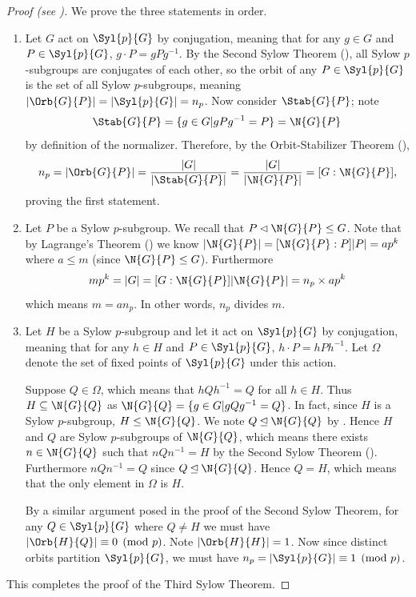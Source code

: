 \begin{proof}[Proof (see \cite{wielandt_1959})]
    We prove the three statements in order.
    \begin{enumerate}
        \item Let $G$ act on $\Syl{p}{G}$ by conjugation, meaning that for any $g \in G$ and $P \in \Syl{p}{G}$, $g\cdot P = gPg^{-1}$. By the Second Sylow Theorem (), all Sylow $p$-subgroups are conjugates of each other, so the orbit of any $P \in \Syl{p}{G}$ is the set of all Sylow $p$-subgroups, meaning $|\Orb{G}{P}| = |\Syl{p}{G}| = n_p$. Now consider $\Stab{G}{P}$; note
        \[
            \Stab{G}{P} = \{g \in G \vert gPg^{-1} = P\} = \N{G}{P}
        \]
        by definition of the normalizer. Therefore, by the Orbit-Stabilizer Theorem (),
        \[
            n_p = |\Orb{G}{P}| = \frac{|G|}{|\Stab{G}{P}|} = \frac{|G|}{|\N{G}{P}|} = [G : \N{G}{P}],
        \]
        proving the first statement.

        \item Let $P$ be a Sylow $p$-subgroup. We recall that $P \lhd \N{G}{P} \leq G$. Note that by Lagrange's Theorem () we know $|\N{G}{P}| = [\N{G}{P} : P]|P| = ap^k$ where $a \leq m$ (since $\N{G}{P} \leq G$). Furthermore
        \[
            mp^k = |G| = [G: \N{G}{P}]|\N{G}{P}| = n_p \times ap^k
        \]
        which means $m = an_p$. In other words, $n_p$ divides $m$.

        \item Let $H$ be a Sylow $p$-subgroup and let it act on $\Syl{p}{G}$ by conjugation, meaning that for any $h \in H$ and $P \in \Syl{p}{G}$, $h \cdot P = hPh^{-1}$. Let $\Omega$ denote the set of fixed points of $\Syl{p}{G}$ under this action.

        Suppose $Q \in \Omega$, which means that $hQh^{-1} = Q$ for all $h \in H$. Thus $H \subseteq \N{G}{Q}$ as $\N{G}{Q} = \{g \in G \vert gQg^{-1} = Q\}$. In fact, since $H$ is a Sylow $p$-subgroup, $H \leq \N{G}{Q}$. We note $Q \unlhd \N{G}{Q}$ by . Hence $H$ and $Q$ are Sylow $p$-subgroups of $\N{G}{Q}$, which means there exists $n \in \N{G}{Q}$ such that $nQn^{-1} = H$ by the Second Sylow Theorem (). Furthermore $nQn^{-1} = Q$ since $Q \unlhd \N{G}{Q}$. Hence $Q = H$, which means that the only element in $\Omega$ is $H$.

        By a similar argument posed in the proof of the Second Sylow Theorem, for any $Q \in \Syl{p}{G}$ where $Q \neq H$ we must have $|\Orb{H}{Q}| \equiv 0 \pmod p$. Note $|\Orb{H}{H}| = 1$. Now since distinct orbits partition $\Syl{p}{G}$, we must have $n_p = |\Syl{p}{G}| \equiv 1 \pmod p$.
    \end{enumerate}
    This completes the proof of the Third Sylow Theorem.
\end{proof}

